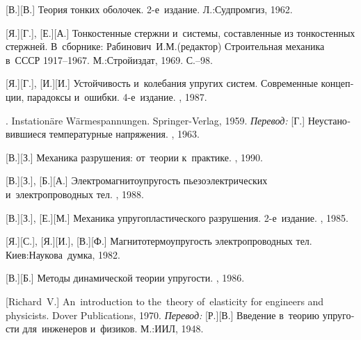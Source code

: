 \begin{thebibliography}{123}
\begin{otherlanguage}{russian}
[В.][В.] Теория тонких оболочек. 2\hbox{-}е~издание. Л.:\;Судпромгиз, 1962. 

[Я.][Г.], [Е.][А.] Тонкостенные стержни и~системы, составленные из тонкостенных стержней. В~сборнике: Рабинович~И.\:М.\:(редактор) Строительная механика в~СССР 1917\hbox{--}1967. М.:\;Строй\-издат, 1969. С.\hbox{--}98.

[Я.][Г.], [И.][И.] Устойчивость и~колебания упругих систем. Современные концепции, парадоксы и~ошибки. 4\hbox{-}е~издание. \naukapublisher, 1987. 

. Instation\"{a}re W\"{a}rmespannungen. Springer\hbox{-}Verlag, 1959. 
\emph{Перевод:} [Г.] Неустановившиеся температурные напряжения. \fizmatgiz, 1963. 

[В.][З.] Механика разрушения: от~теории к~практике. \naukapublisher, 1990. 

[В.][З.], [Б.][А.] Электромагнитоупругость пьезоэлектрических и~электропроводных тел. \naukapublisher, 1988. 

[В.][З.], [Е.][М.] Механика упругопластического разрушения. 2\hbox{-}е~издание. \naukapublisher, 1985. 

[Я.][С.], [Я.][И.], [В.][Ф.]
Магнито\-термо\-упру\-гость электропроводных тел.
Киев:\;Наукова~думка, 1982.

[В.][Б.] Методы динамической теории упругости. \naukapublisher, 1986.

[Richard~V.]
An~introduction to the~theory of~elasticity for engineers and physicists.
Dover Publications, 1970.
\emph{Перевод:}
[Р.][В.]
Введение в~теорию упругости для~инженеров и~физиков.
М.:\;ИИЛ, 1948.


\end{otherlanguage}
\end{thebibliography}

